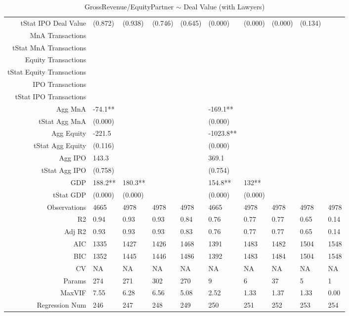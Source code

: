 \begin{table}[ht]
\begin{tabular}{rlllllllll}
  tStat IPO Deal Value & (0.872) & (0.938) & (0.746) & (0.645) & (0.000) & (0.000) & (0.000) & (0.134) &  \\ 
  MnA Transactions &  &  &  &  &  &  &  &  &  \\ 
  tStat MnA Transactions &  &  &  &  &  &  &  &  &  \\ 
  Equity Transactions &  &  &  &  &  &  &  &  &  \\ 
  tStat Equity Transactions &  &  &  &  &  &  &  &  &  \\ 
  IPO Transactions &  &  &  &  &  &  &  &  &  \\ 
  tStat IPO Transactions &  &  &  &  &  &  &  &  &  \\ 
  Agg MnA & -74.1** &  &  &  & -169.1** &  &  &  &  \\ 
  tStat Agg MnA & (0.000) &  &  &  & (0.000) &  &  &  &  \\ 
  Agg Equity & -221.5 &  &  &  & -1023.8** &  &  &  &  \\ 
  tStat Agg Equity & (0.116) &  &  &  & (0.000) &  &  &  &  \\ 
  Agg IPO & 143.3 &  &  &  & 369.1 &  &  &  &  \\ 
  tStat Agg IPO & (0.758) &  &  &  & (0.754) &  &  &  &  \\ 
  GDP & 188.2** & 180.3** &  &  & 154.8** & 132** &  &  &  \\ 
  tStat GDP & (0.000) & (0.000) &  &  & (0.000) & (0.000) &  &  &  \\ 
  Observations & 4665 & 4978 & 4978 & 4978 & 4665 & 4978 & 4978 & 4978 & 4978 \\ 
  R2 & 0.94 & 0.93 & 0.93 & 0.84 & 0.76 & 0.77 & 0.77 & 0.65 & 0.14 \\ 
  Adj R2 & 0.93 & 0.93 & 0.93 & 0.83 & 0.76 & 0.77 & 0.77 & 0.65 & 0.14 \\ 
  AIC & 1335 & 1427 & 1426 & 1468 & 1391 & 1483 & 1482 & 1504 & 1548 \\ 
  BIC & 1352 & 1445 & 1446 & 1486 & 1392 & 1483 & 1484 & 1504 & 1548 \\ 
  CV & NA & NA & NA & NA & NA & NA & NA & NA & NA \\ 
  Params & 274 & 271 & 302 & 270 & 9 & 6 & 37 & 5 & 1 \\ 
  MaxVIF & 7.55 & 6.28 & 6.56 & 5.08 & 2.52 & 1.33 & 1.37 & 1.33 & 0.00 \\ 
  Regression Num & 246 & 247 & 248 & 249 & 250 & 251 & 252 & 253 & 254 \\ 
   \hline
\end{tabular}
\caption{GrossRevenue/EquityPartner $\sim$ Deal Value (with Lawyers)} 
\end{table}
